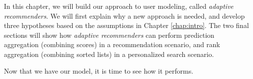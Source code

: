 \label{chap:methods}

In this chapter, we will build our approach to user modeling,
called \emph{adaptive recommenders}.
We will first explain why a new approach is needed,
and develop three hypotheses based on the 
assumptions in Chapter \ref{chap:intro}.
The two final sections will show how \emph{adaptive recommenders}
can perform prediction aggregation (combining scores) in a recommendation scenario,
and rank aggregation (combining sorted lists) in a personalized search scenario.







Now that we have our model,
it is time to see how it performs.

%
